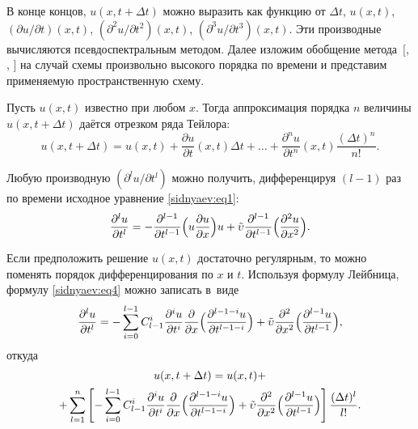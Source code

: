 В конце концов, $u(x,t+\Delta t)$ можно выразить как функцию
от $\Delta t$, $u (x,t)$, $({\partial u}/{\partial t})(x,t)$, $({\partial ^2u}/
{\partial t^2})(x,t)$, $({\partial^3u}/ {\partial t^3}) (x,t)$. 
Эти производные вычисляются псевдоспектральным методом. 
Далее изложим обобщение метода~[, , ] на случай схемы произвольно высокого порядка по времени и представим применяемую пространственную схему.

Пусть $u(x,t)$ известно при любом $x$. 
Тогда аппроксимация порядка $n$ величины $u (x,t+\Delta t)$ даётся отрезком ряда
Тейлора:
\begin{equation}
\label{sidnyaev:eq3}
u (x,t+\Delta t)=u (x,t)+\frac{\partial u}{\partial t} (x,t)\Delta
t+ \ldots +\frac{\partial ^nu}{\partial t^n} (x,t) \frac{ (\Delta t)^n}{n!}.
\end{equation}

Любую производную $({\partial^lu}/{\partial t^l})$ можно получить, дифференцируя $ (l-1)$ раз по времени исходное уравнение \eqref{sidnyaev:eq1}:
\begin{equation}
\label{sidnyaev:eq4}
\frac{\partial ^lu}{\partial
t^l}=-\frac{\partial ^{l-1}}{\partial t^{l-1}}\Bigl(u\frac{\partial u}{\partial x} \Bigr)u+  \tilde{\upsilon}  \frac{\partial
^{l-1}}{\partial t^{l-1}} \Bigl( \frac{\partial ^2u}{\partial
x^2} \Bigr).
\end{equation}

Если предположить решение $u (x,t)$ достаточно регулярным, то можно поменять порядок дифференцирования по $x$ и $t$. 
Используя формулу Лейбница, формулу \eqref{sidnyaev:eq4} можно записать в~виде 
\begin{equation}
\label{sidnyaev:eq5}
\frac{\partial ^lu}{\partial t^l}=-\sum\limits_{i=0}^{l-1} C_{l-1}^i \frac{\partial
^iu}{\partial t^i}\frac{\partial }{\partial x}\Bigl( \frac{\partial ^{l-1-i}u}{\partial t^{l-1-i}} \Bigr) +  \tilde{\upsilon}  
\frac{\partial ^2}{\partial x^2}
\Bigl( \frac{\partial
^{l-1}u}{\partial t^{l-1}}\Bigr),
\end{equation}
откуда
\begin{multline}
\label{sidnyaev:eq6}
u(x,t+\Delta t)=u(x,t)+\\
+\sum\limits_{l=1}^n \left[ -\sum\limits_{i=0}^{l-1}
C_{l-1}^i \frac{\partial ^iu}{\partial t^i}\frac{\partial
}{\partial x}\Bigl( \frac{\partial ^{l-1-i}u}{\partial t^{l-1-i}}\Bigr) +  \tilde{\upsilon}  \frac{\partial ^2}{\partial x^2}
\Bigl( \frac{\partial ^{l-1}u}{\partial t^{l-1}} \Bigr)\right] \frac{(\Delta t)^l}{l!}.
\end{multline}

